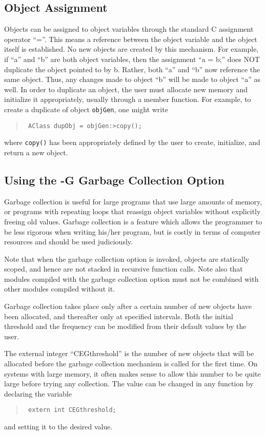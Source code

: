 \subsection{Object Assignment}
Objects can be assigned to object variables through the standard C
assignment operator ``=''.  This means a
reference between the object variable and the object itself is
established.  No new objects are created by this mechanism.  For example,
if ``a'' and ``b'' are both object variables, then the assignment ``a = b;''
does NOT duplicate the object pointed to by b.  Rather, both ``a'' and ``b'' now
reference the same object.  Thus, any changes made to object ``b'' will be
made to object ``a'' as well.  In order to duplicate an object, the user must
allocate new memory and initialize it appropriately,
usually through a member function.  For example, to create a duplicate
of object {\tt objGen}, one might write
\begin{quote} \tt
AClass dupObj = objGen:>copy();
\end{quote}
where {\tt copy()} has been appropriately defined by the user to create,
initialize, and return a new object.

\subsection{Using the -G Garbage Collection Option}
Garbage collection is useful for large programs that use large amounts of
memory, or programs with repeating loops that reassign object variables
without explicitly freeing old values.  Garbage collection is a feature
which allows the programmer to be less rigorous when writing his/her
program, but is costly in terms of computer resources and should be used
judiciously.

Note that when the garbage collection option is invoked, objects
are statically scoped, and hence are not stacked in recursive function
calls.  Note also that modules compiled with the garbage collection
option must not be combined with other modules compiled without it.

Garbage collection takes place only after a certain number of new objects
have been allocated, and thereafter only at specified intervals.
Both the initial threshold and the frequency can be modified from their
default values by the user.

The external integer ``CEGthreshold'' is the number of new objects that
will be allocated before the garbage collection mechanism is called for the
first time.  On systems with large memory, it often makes sense to allow
this number to be quite large before trying any collection.  The value
can be changed in any function by declaring the variable
\begin{quote} \tt
extern int CEGthreshold;
\end{quote}
and setting it to the desired value.

